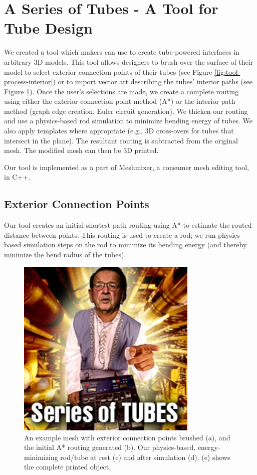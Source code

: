 \section{A Series of Tubes - A Tool for Tube Design}

We created a tool which makers can use to create tube-powered interfaces in arbitrary 3D models.  This tool allows designers to brush over the surface of their model to select exterior connection points of their tubes (see Figure \ref{fig:tool-process-interior}) or to import vector art describing the tubes' interior paths (see Figure \ref{fig:tool-process-exterior}).  Once the user's selections are made, we create a complete routing using either the exterior connection point method (A*) or the interior path method (graph edge creation, Euler circuit generation).  We thicken our routing and use a physics-based rod simulation to minimize bending energy of tubes.  We also apply templates where appropriate (e.g., 3D cross-overs for tubes that intersect in the plane).  The resultant routing is subtracted from the original mesh.  The modified mesh can then be 3D printed.

Our tool is implemented as a part of Meshmixer, a consumer mesh editing tool, in C++.

\subsection{Exterior Connection Points}

Our tool creates an initial shortest-path routing using A* to estimate the routed distance between points.  This routing is used to create a rod; we run physics-based simulation steps on the rod to minimize its bending energy (and thereby minimize the bend radius of the tubes).

\begin{figure}[h!]
\centering
    \includegraphics[width=3.4in]{figures/series-of-tubes.jpg}
\caption{An example mesh with exterior connection points brushed (a), and the initial A* routing generated (b).  Our physics-based, energy-minimizing rod/tube at rest (c) and after simulation (d).  (e) shows the complete printed object.}
\label{fig:tool-process-exterior}
\end{figure}

